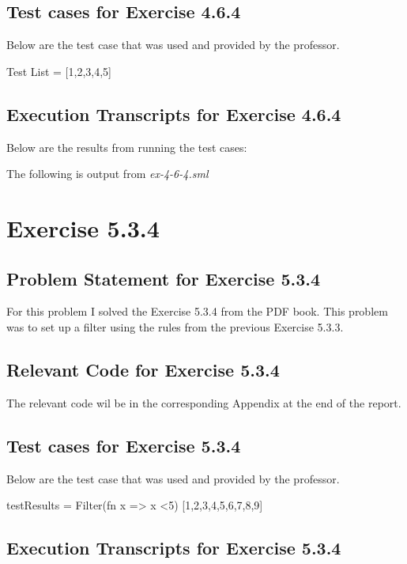 \documentclass{report}
\begin{document}
\section{Test cases for Exercise 4.6.4}
\label{sec:tests-ex-4-6-4}
Below are the test case that was used and provided by the professor.

Test List = [1,2,3,4,5]

\section{Execution Transcripts for Exercise 4.6.4}
\label{sec:exe-ex-4-6-4}

Below are the results from running the test cases:

The following is output from \emph{ex-4-6-4.sml}


\chapter{Exercise 5.3.4}
\label{cha:exercise-5-3-4}

\section{Problem Statement for Exercise 5.3.4}
\label{sec:problem-statement-ex-5-3-4}
For this problem I solved the Exercise 5.3.4 from the PDF book.  This
problem was to set up a filter using the rules from the previous
Exercise 5.3.3.

\section{Relevant Code for Exercise 5.3.4}
\label{sec:relevant-code-ex-5-3-4}
  The relevant code wil be in the corresponding Appendix at the
  end of the report.

\section{Test cases for Exercise 5.3.4}
\label{sec:tests-ex-5-3-4}
Below are the test case that was used and provided by the professor.

testResults = Filter(fn x => x <5) [1,2,3,4,5,6,7,8,9]

\section{Execution Transcripts for Exercise 5.3.4}
\label{sec:exe-ex-5-3-4}
\end{document}
